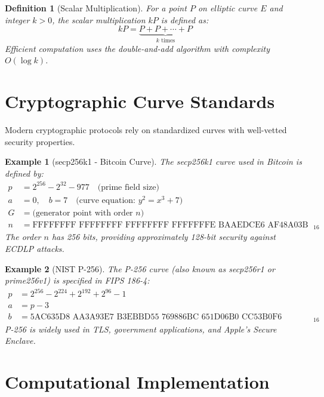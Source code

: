 \documentclass[a4paper, 11pt]{article}
\newtheorem{definition}{Definition}[section]
\newtheorem{example}{Example}[section]
\begin{document}
\begin{definition}[Scalar Multiplication]
For a point $P$ on elliptic curve $E$ and integer $k > 0$, the scalar multiplication $kP$ is defined as:
\begin{equation}
kP = \underbrace{P + P + \cdots + P}_{k \text{ times}}
\end{equation}
Efficient computation uses the double-and-add algorithm with complexity $O(\log k)$.
\end{definition}

\section{Cryptographic Curve Standards}

Modern cryptographic protocols rely on standardized curves with well-vetted security properties.

\begin{example}[secp256k1 - Bitcoin Curve]
The secp256k1 curve used in Bitcoin is defined by:
\begin{align}
p &= 2^{256} - 2^{32} - 977 \quad \text{(prime field size)} \\
a &= 0, \quad b = 7 \quad \text{(curve equation: } y^2 = x^3 + 7 \text{)} \\
G &= \text{(generator point with order } n \text{)} \\
n &= \text{FFFFFFFF FFFFFFFF FFFFFFFF FFFFFFFE BAAEDCE6 AF48A03B BFD25E8C D0364141}_{16}
\end{align}
The order $n$ has 256 bits, providing approximately 128-bit security against ECDLP attacks.
\end{example}

\begin{example}[NIST P-256]
The P-256 curve (also known as secp256r1 or prime256v1) is specified in FIPS 186-4:
\begin{align}
p &= 2^{256} - 2^{224} + 2^{192} + 2^{96} - 1 \\
a &= p - 3 \\
b &= \text{5AC635D8 AA3A93E7 B3EBBD55 769886BC 651D06B0 CC53B0F6 3BCE3C3E 27D2604B}_{16}
\end{align}
P-256 is widely used in TLS, government applications, and Apple's Secure Enclave.
\end{example}

\section{Computational Implementation}
\end{document}
